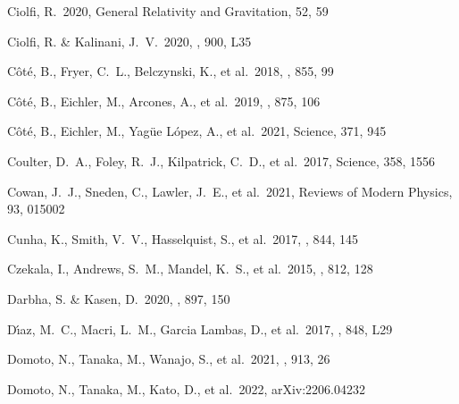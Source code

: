 \documentclass[twocolumn, twocolappendix]{aastex63}
\begin{document}
\begin{thebibliography}{}


 Ciolfi, R.\ 2020, General Relativity and Gravitation, 52, 59


 Ciolfi, R. \& Kalinani, J.~V.\ 2020, \apjl, 900, L35


 C{\^o}t{\'e}, B., Fryer, C.~L., Belczynski, K., et al.\ 2018, \apj, 855, 99


 C{\^o}t{\'e}, B., Eichler, M., Arcones, A., et al.\ 2019, \apj, 875, 106


 C{\^o}t{\'e}, B., Eichler, M., Yag{\"u}e L{\'o}pez, A., et al.\ 2021, Science, 371, 945


 Coulter, D.~A., Foley, R.~J., Kilpatrick, C.~D., et al.\ 2017, Science, 358, 1556




 Cowan, J.~J., Sneden, C., Lawler, J.~E., et al.\ 2021, Reviews of Modern Physics, 93, 015002


 Cunha, K., Smith, V.~V., Hasselquist, S., et al.\ 2017, \apj, 844, 145


 Czekala, I., Andrews, S.~M., Mandel, K.~S., et al.\ 2015, \apj, 812, 128


 Darbha, S. \& Kasen, D.\ 2020, \apj, 897, 150


 D{\'\i}az, M.~C., Macri, L.~M., Garcia Lambas, D., et al.\ 2017, \apjl, 848, L29


 Domoto, N., Tanaka, M., Wanajo, S., et al.\ 2021, \apj, 913, 26


 Domoto, N., Tanaka, M., Kato, D., et al.\ 2022, arXiv:2206.04232



\end{thebibliography}
\end{document}
